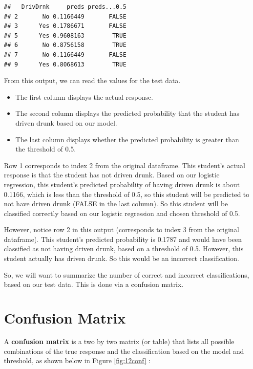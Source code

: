\documentclass[
]{book}
\providecommand{\tightlist}{%
  \setlength{\itemsep}{0pt}\setlength{\parskip}{0pt}}
\begin{document}
\begin{verbatim}
##   DrivDrnk     preds preds...0.5
## 2       No 0.1166449       FALSE
## 3      Yes 0.1786671       FALSE
## 5      Yes 0.9608163        TRUE
## 6       No 0.8756158        TRUE
## 7       No 0.1166449       FALSE
## 9      Yes 0.8068613        TRUE
\end{verbatim}

From this output, we can read the values for the test data.

\begin{itemize}
\tightlist
\item
  The first column displays the actual response.
\item
  The second column displays the predicted probability that the student has driven drunk based on our model.
\item
  The last column displays whether the predicted probability is greater than the threshold of 0.5.
\end{itemize}

Row 1 corresponds to index 2 from the original dataframe. This student's actual response is that the student has not driven drunk. Based on our logistic regression, this student's predicted probability of having driven drunk is about 0.1166, which is less than the threshold of 0.5, so this student will be predicted to not have driven drunk (FALSE in the last column). So this student will be classified correctly based on our logistic regression and chosen threshold of 0.5.

However, notice row 2 in this output (corresponds to index 3 from the original dataframe). This student's predicted probability is 0.1787 and would have been classified as not having driven drunk, based on a threshold of 0.5. However, this student actually has driven drunk. So this would be an incorrect classification.

So, we will want to summarize the number of correct and incorrect classifications, based on our test data. This is done via a confusion matrix.

\hypertarget{confusion-matrix}{%
\section{Confusion Matrix}\label{confusion-matrix}}

A \textbf{confusion matrix} is a two by two matrix (or table) that lists all possible combinations of the true response and the classification based on the model and threshold, as shown below in Figure \ref{fig:12conf} :
\end{document}
